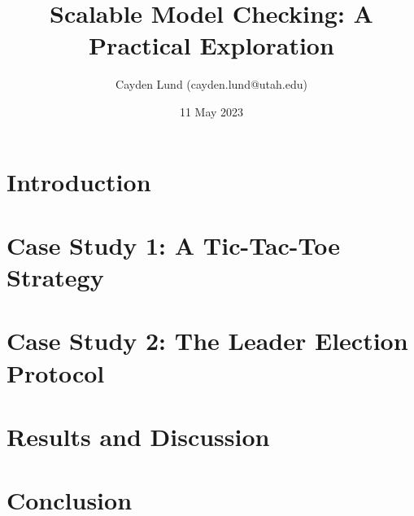 \documentclass[11pt]{article}
\author{Cayden Lund (cayden.lund@utah.edu)}
\date{11 May 2023}
\title{Scalable Model Checking: A Practical Exploration}
\begin{document}
    \maketitle


    \section{Introduction}\label{sec:introduction}

    


    \section{Case Study 1: A Tic-Tac-Toe Strategy}\label{sec:tic-tac-toe}

    


    \section{Case Study 2: The Leader Election Protocol}\label{sec:leader-election}

    


    \section{Results and Discussion}\label{sec:results-and-discussion}

    


    \section{Conclusion}\label{sec:conclusion}

    
\end{document}
